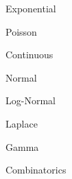 \documentclass[11pt]{article}
\begin{document}
\begin{enumerate}
\begin{item}
\begin{enumerate}
\begin{item}
\begin{enumerate}
\begin{item}
\begin{enumerate}
                      \begin{item}
                        Exponential
                      \end{item}

                      \begin{item}
                        Poisson
                      \end{item}

                  \end{enumerate}

                \end{item}

                \begin{item}

                  Continuous

                  \begin{enumerate}

                      \begin{item}
                        Normal
                      \end{item}

                      \begin{item}
                        Log-Normal
                      \end{item}

                      \begin{item}
                        Laplace
                      \end{item}

                      \begin{item}
                        Gamma
                      \end{item}

                  \end{enumerate}

                \end{item}

            \end{enumerate}

          \end{item}

          \begin{item}
            Combinatorics
          \end{item}

      \end{enumerate}

    \end{item}

\end{enumerate}
\end{document}
